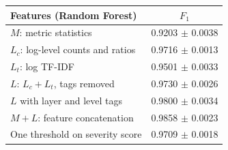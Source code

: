 \begin{tabular}{@{}lc@{}}
\toprule
Features (Random Forest) & $F_1$ \\
\midrule
$M$: metric statistics & 0.9203 $\pm$ 0.0038 \\
$L_c$: log-level counts and ratios & 0.9716 $\pm$ 0.0013 \\
$L_t$: log TF-IDF & 0.9501 $\pm$ 0.0033 \\
$L$: $L_c+L_t$, tags removed & 0.9730 $\pm$ 0.0026 \\
$L$ with layer and level tags & 0.9800 $\pm$ 0.0034 \\
$M+L$: feature concatenation & 0.9858 $\pm$ 0.0023 \\
One threshold on severity score & 0.9709 $\pm$ 0.0018 \\
\bottomrule
\end{tabular}
